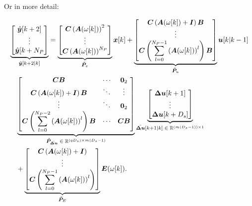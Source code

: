 Or in more detail:

\begin{equation}
	\begin{aligned}
		&\underbrace{
			\begin{bmatrix}
				\hat{\bm{y}}[k+2] \\
				\vdots \\
				\hat{\bm{y}}[k+N_P
			\end{bmatrix}
		}_{\Bar{\bm{y}}[k+2|k]}
		=
		\underbrace{
			\begin{bmatrix}
				\bm{C}\left(\bm{A}(\omega[k])\right)^2 \\
				\vdots \\
				\bm{C}\left(\bm{A}(\omega[k])\right)^{N_P}
			\end{bmatrix}
		}_{\Tilde{\bm{P}}_x}
		{\bm{x}}[k]
		+
		\underbrace{
			\begin{bmatrix}
				\bm{C}\left(\bm{A}(\omega[k])+\bm{I}\right)\bm{B} \\
				\vdots \\
				\bm{C}\left(\displaystyle\sum_{l=0}^{N_P-1}
				\left(\bm{A}(\omega[k])\right)^l\right)\bm{B}
			\end{bmatrix}
		}_{\Tilde{\bm{P}}_u}
		\bm{u}[k|k-1]
		\\
		&\quad
		\underbrace{
			\begin{bmatrix}
				\bm{C}\bm{B}
				&
				\cdots
				&
				\bm{0}_2\\
				\bm{C}\left(\bm{A}(\omega[k])+\bm{I}\right)\bm{B}
				&
				\ddots
				&
				\vdots
				\\
				\vdots
				&
				\ddots
				&
				\bm{0}_2
				\\
				\bm{C}\left(
				\displaystyle\sum_{l=0}^{N_P-2}
				\left(\bm{A}(\omega[k])\right)^l
				\right)\bm{B}
				&
				\cdots
				&
				\bm{C}\bm{B}
			\end{bmatrix}
		}_{\Tilde{\bm{P}}_{\Bar{\bm{\Delta u}}} \;\in\; \mathbb{R}^{(q D_s)\times m (D_s-1)}}
		\underbrace{
			\begin{bmatrix}
				\boldsymbol{\Delta u}[k+1] \\
				\vdots \\
				\boldsymbol{\Delta u}[k+D_s]
			\end{bmatrix}
		}_{\Bar{\bm{\Delta u}}[k+1|k]\; \in  \;\mathbb{R}^{(m (D_s-1))\times 1}}
		\\
		&\quad+
		\underbrace{
			\begin{bmatrix}
				\bm{C}\left(\bm{A}(\omega[k])+\bm{I}\right) \\
				\vdots \\
				\bm{C}\left(
				\displaystyle\sum_{l=0}^{N_P-1}
				\left(\bm{A}(\omega[k])\right)^l
				\right)
			\end{bmatrix}
		}_{\Tilde{\bm{P}}_E}
		\bm{E}(\omega[k]) .
	\end{aligned}
	\label{equ:prediction_full_dtc}
\end{equation}

